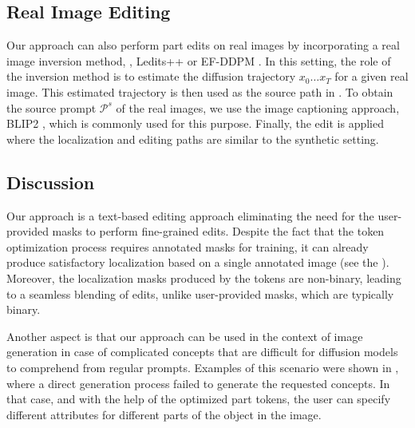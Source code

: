 \subsection{Real Image Editing}\label{sec:real}
Our approach can also perform part edits on real images by incorporating a real image inversion method, \eg, Ledits++ \citep{brack2024ledits} or EF-DDPM \citep{huberman2024edit}.
In this setting, the role of the inversion method is to estimate the diffusion trajectory $x_0 \dots x_T$ for a given real image.
This estimated trajectory is then used as the source path in .
To obtain the source prompt $\mathcal{P}^s$ of the real images, we use the image captioning approach, BLIP2 \citep{li2023blip}, which is commonly used for this purpose.
Finally, the edit is applied where the localization and editing paths are similar to the synthetic setting.


\subsection{Discussion}
Our approach is a text-based editing approach eliminating the need for the user-provided masks to perform fine-grained edits.
Despite the fact that the token optimization process requires annotated masks for training, it can already produce satisfactory localization based on a single annotated image (see the ). %
Moreover, the localization masks produced by the tokens are non-binary, leading to a seamless blending of edits, unlike user-provided masks, which are typically binary.

Another aspect is that our approach can be used in the context of image generation in case of complicated concepts that are difficult for diffusion models to comprehend from regular prompts.
Examples of this scenario were shown in , where a direct generation process failed to generate the requested concepts.
In that case, and with the help of the optimized part tokens, the user can specify different attributes for different parts of the object in the image.
